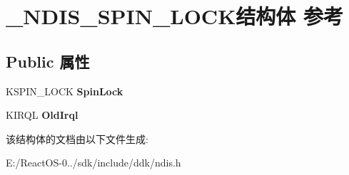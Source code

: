 \hypertarget{struct___n_d_i_s___s_p_i_n___l_o_c_k}{}\section{\+\_\+\+N\+D\+I\+S\+\_\+\+S\+P\+I\+N\+\_\+\+L\+O\+C\+K结构体 参考}
\label{struct___n_d_i_s___s_p_i_n___l_o_c_k}
\subsection*{Public 属性}
\begin{DoxyCompactItemize}
\item 
\mbox{\label{struct___n_d_i_s___s_p_i_n___l_o_c_k_a5e1a6d83801c2e957863f82941ef231d}} 
K\+S\+P\+I\+N\+\_\+\+L\+O\+CK {\bfseries Spin\+Lock}
\item 
\mbox{\label{struct___n_d_i_s___s_p_i_n___l_o_c_k_a7d5e2b9cc0b3280a436ca55f584f4593}} 
K\+I\+R\+QL {\bfseries Old\+Irql}
\end{DoxyCompactItemize}


该结构体的文档由以下文件生成\+:\begin{DoxyCompactItemize}
\item 
E\+:/\+React\+O\+S-\/0../sdk/include/ddk/ndis.\+h\end{DoxyCompactItemize}
